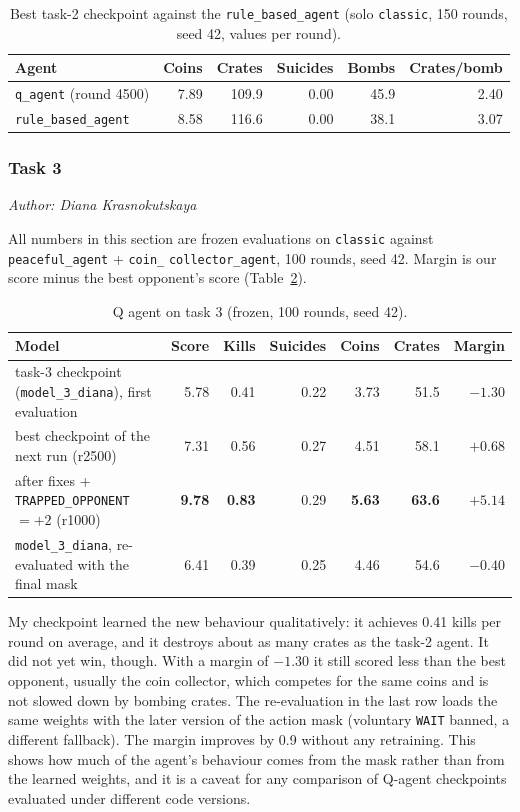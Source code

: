 \documentclass[11pt]{article}
\newcommand{\authorline}[1]{\noindent\textit{Author: #1}\par\medskip}
\newcommand{\code}[1]{\texttt{#1}}
\begin{document}
\begin{table}[htbp]
\centering\small
\caption{Best task-2 checkpoint against the \code{rule\_based\_agent} (solo \code{classic},
150 rounds, seed 42, values per round).}
\label{tab:q-task2}
\begin{tabular}{@{}lrrrrr@{}}
\toprule
Agent & Coins & Crates & Suicides & Bombs & Crates/bomb \\
\midrule
\code{q\_agent} (round 4500) & 7.89 & 109.9 & 0.00 & 45.9 & 2.40 \\
\code{rule\_based\_agent} & 8.58 & 116.6 & 0.00 & 38.1 & 3.07 \\
\bottomrule
\end{tabular}
\end{table}

\subsubsection{Task 3}
\label{sec:q-task3-results}
\authorline{Diana Krasnokutskaya}

All numbers in this section are frozen evaluations on \code{classic} against
\code{peaceful\_agent} + \code{coin\_} \code{collector\_agent}, 100 rounds, seed 42. Margin is our score minus the best opponent's score (Table~\ref{tab:q-task3}).

\begin{table}[htbp]
  \centering\small
  \caption{Q agent on task 3 (frozen, 100 rounds, seed 42).}
  \label{tab:q-task3}
  \begin{tabularx}{\linewidth}{@{}l rrrrrr@{}}
    Model & Score & Kills & Suicides & Coins & Crates & Margin \\
    \midrule
    task-3 checkpoint (\code{model\_3\_diana}), first evaluation & 5.78 & 0.41 & 0.22 & 3.73 & 51.5 & $-1.30$ \\
    best checkpoint of the next run (r2500) & 7.31 & 0.56 & 0.27 & 4.51 & 58.1 & $+0.68$ \\
    after fixes + \code{TRAPPED\_OPPONENT} $=+2$ (r1000) & \textbf{9.78} & \textbf{0.83} & 0.29 & \textbf{5.63} & \textbf{63.6} & $\mathbf{+5.14}$ \\
    \code{model\_3\_diana}, re-evaluated with the final mask & 6.41 & 0.39 & 0.25 & 4.46 & 54.6 & $-0.40$ \\
    \bottomrule
  \end{tabularx}
\end{table}

My checkpoint learned the new behaviour qualitatively: it achieves 0.41 kills per round on average, and it destroys about as many crates as the task-2 agent. It did not yet win, though. With a margin of $-1.30$ it still scored less than the best opponent, usually the coin collector, which competes for the same coins and is not slowed down by bombing crates. The re-evaluation in the last row loads the same weights with the later version of the action mask (voluntary \code{WAIT} banned, a different fallback). The margin improves by 0.9
without any retraining. This shows how much of the agent's behaviour comes from the mask rather than from the learned weights, and it is a caveat for any comparison of Q-agent checkpoints evaluated under different code versions.
\end{document}
